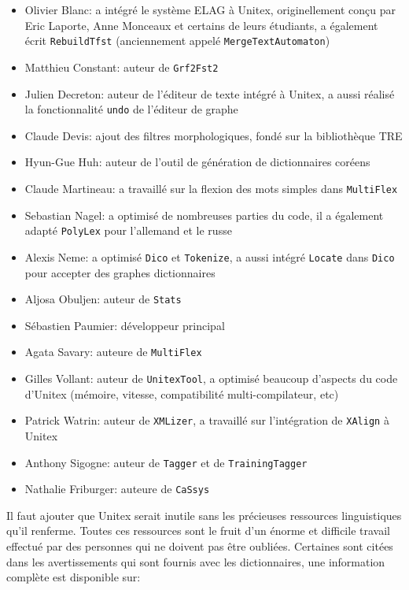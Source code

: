 \begin{itemize}                   
    \item Olivier Blanc: a intégré le système ELAG à Unitex, originellement conçu par Eric Laporte,
    Anne Monceaux et certains de leurs étudiants, a également écrit \verb+RebuildTfst+ (anciennement
     appelé \verb+MergeTextAutomaton+)
    \item Matthieu Constant: auteur de \verb+Grf2Fst2+
    \item Julien Decreton: auteur de l'éditeur de texte intégré à Unitex,
    	    a aussi réalisé la fonctionnalité \verb+undo+ de l'éditeur de graphe
    \item Claude Devis: ajout des filtres morphologiques, fondé sur la bibliothèque TRE
    \item Hyun-Gue Huh: auteur de l'outil de génération de dictionnaires coréens
    \item Claude Martineau: a travaillé sur la flexion des mots simples dans \verb+MultiFlex+
    \item Sebastian Nagel: a optimisé de nombreuses parties du code, il a également adapté
    	    \verb+PolyLex+ pour l'allemand et le russe
    \item Alexis Neme: a optimisé \verb+Dico+ et \verb+Tokenize+, a aussi intégré \verb+Locate+ dans \verb+Dico+ pour accepter des graphes dictionnaires
     \item Aljosa Obuljen: auteur de \verb+Stats+
     \item Sébastien Paumier: développeur principal
     \item Agata Savary: auteure de \verb+MultiFlex+
    \item Gilles Vollant: auteur de \verb+UnitexTool+, a optimisé beaucoup
    	    d'aspects du code d'Unitex (mémoire, vitesse, compatibilité multi-compilateur, etc)
    \item Patrick Watrin: auteur de \verb+XMLizer+, a travaillé sur l'intégration de \verb+XAlign+ à Unitex
    \item Anthony Sigogne: auteur de \verb+Tagger+ et de \verb+TrainingTagger+
    \item Nathalie Friburger: auteure de \verb+CaSsys+
\end{itemize}

\bigskip
\noindent Il faut ajouter que Unitex serait inutile sans les précieuses ressources linguistiques
qu'il renferme. Toutes ces ressources sont le fruit d'un énorme et difficile travail effectué par
des personnes qui ne doivent pas être oubliées. Certaines sont citées dans les avertissements qui
sont fournis avec les dictionnaires, une information complète est disponible sur:

